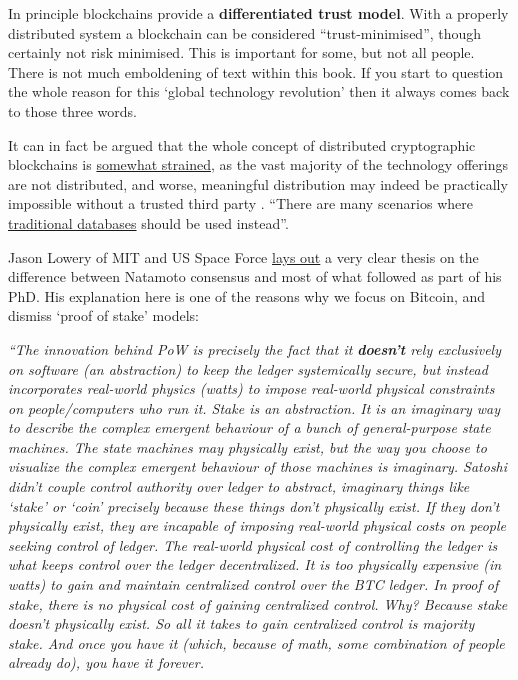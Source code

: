 In principle blockchains provide a \textbf{differentiated trust model}. With a properly distributed system a blockchain can be considered ``trust-minimised'', though certainly not risk minimised. This is important for some, but not all people. There is not much emboldening of text within this book. If you start to question the whole reason for this `global technology revolution' then it always comes back to those three words. \par
It can in fact be argued that the whole concept of distributed cryptographic blockchains is \href{https://www.trailofbits.com/reports/Unintended_Centralities_in_Distributed_Ledgers.pdf}{somewhat strained}, as the vast majority of the technology offerings are not distributed, and worse, meaningful distribution may indeed be practically impossible without a trusted third party \cite{kwon2019impossibility}. ``There are many scenarios where \href{https://calpaterson.com/blockchain.html}{traditional databases} should be used instead''\cite{casino2019systematic}.\par
Jason Lowery of MIT and US Space Force \href{https://twitter.com/JasonPLowery/status/1572275617344757760}{lays out} a very clear thesis on the difference between Natamoto consensus and most of what followed as part of his PhD. His explanation here is one of the reasons why we focus on Bitcoin, and dismiss `proof of stake' models: \par
\textit{``The innovation behind PoW is precisely the fact that it \textbf{doesn't} rely exclusively on software (an abstraction) to keep the ledger systemically secure, but instead incorporates real-world physics (watts) to impose real-world physical constraints on people/computers who run it. Stake is an abstraction. It is an imaginary way to describe the complex emergent behaviour of a bunch of general-purpose state machines. The state machines may physically exist, but the way you choose to visualize the complex emergent behaviour of those machines is imaginary. Satoshi didn't couple control authority over ledger to abstract, imaginary things like `stake' or `coin' precisely because these things don't physically exist. If they don't physically exist, they are incapable of imposing real-world physical costs on people seeking control of ledger. The real-world physical cost of controlling the ledger is what keeps control over the ledger decentralized. It is too physically expensive (in watts) to gain and maintain centralized control over the BTC ledger. In proof of stake, there is no physical cost of gaining centralized control. Why? Because stake doesn't physically exist. So all it takes to gain centralized control is majority stake. And once you have it (which, because of math, some combination of people already do), you have it forever.}
